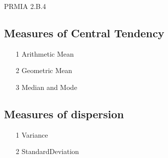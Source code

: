 PRMIA 2.B.4


\subsection*{Measures of Central Tendency}

\begin{itemize}
\item[1] Arithmetic Mean
\item[2] Geometric Mean
\item[3] Median and Mode
\end{itemize}

\subsection*{Measures of dispersion}

\begin{itemize}
\item[1] Variance
\item[2] StandardDeviation
\end{itemize}
